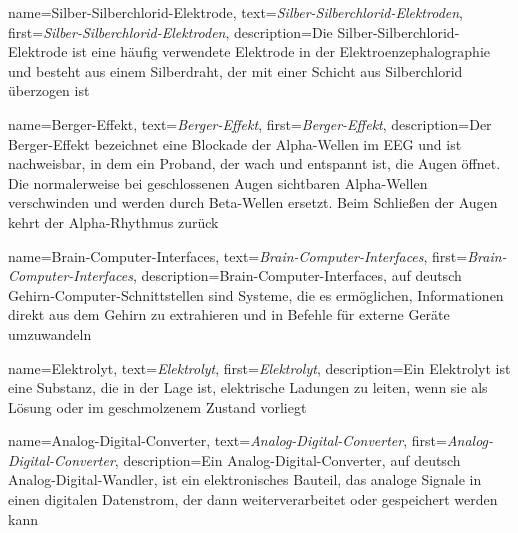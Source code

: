     {
    name=Silber-Silberchlorid-Elektrode,
    text={\textit{Silber-Silberchlorid-Elektroden}},
    first={\textit{Silber-Silberchlorid-Elektroden}},
    description={Die Silber-Silberchlorid-Elektrode ist eine häufig verwendete Elektrode in der Elektroenzephalographie und besteht aus einem Silberdraht, der mit einer Schicht aus Silberchlorid überzogen ist}
    }

{
    name=Berger-Effekt,
    text={\textit{Berger-Effekt}},
    first={\textit{Berger-Effekt}},
    description={Der Berger-Effekt bezeichnet eine Blockade der Alpha-Wellen im EEG und ist nachweisbar, in dem ein Proband, der wach und entspannt ist, die Augen öffnet. Die normalerweise bei geschlossenen Augen sichtbaren Alpha-Wellen verschwinden und werden durch Beta-Wellen ersetzt. Beim Schließen der Augen kehrt der Alpha-Rhythmus zurück}
}

{
    name=Brain-Computer-Interfaces,
    text={\textit{Brain-Computer-Interfaces}},
    first={\textit{Brain-Computer-Interfaces}},
    description={Brain-Computer-Interfaces, auf deutsch Gehirn-Computer-Schnittstellen sind Systeme, die es ermöglichen, Informationen direkt aus dem Gehirn zu extrahieren und in Befehle für externe Geräte umzuwandeln}
}

{
    name=Elektrolyt,
    text={\textit{Elektrolyt}},
    first={\textit{Elektrolyt}},
    description={Ein Elektrolyt ist eine Substanz, die in der Lage ist, elektrische Ladungen zu leiten, wenn sie als Lösung oder im geschmolzenem Zustand vorliegt}
}

    {name=Analog-Digital-Converter,
    text={\textit{Analog-Digital-Converter}},
    first={\textit{Analog-Digital-Converter}},
    description={Ein Analog-Digital-Converter, auf deutsch Analog-Digital-Wandler, ist ein elektronisches Bauteil, das analoge Signale in einen digitalen Datenstrom, der dann weiterverarbeitet oder gespeichert werden kann}
}

